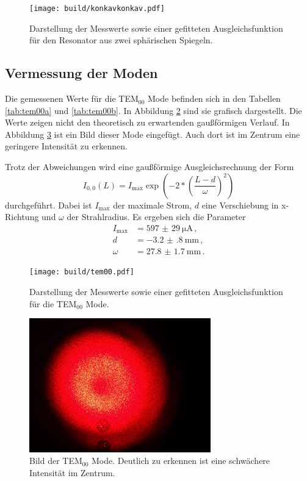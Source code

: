 \begin{figure}
  \centering
  \texttt{[image: build/konkavkonkav.pdf]}
  \caption{Darstellung der Messwerte sowie einer gefitteten Ausgleichsfunktion für den
  Resonator aus zwei sphärischen Spiegeln.}
  \label{fig:konkavkonkav}
\end{figure}

\subsection{Vermessung der Moden}
\label{subsec:moden}

Die gemessenen Werte für die TEM$_{\mathrm{00}}$ Mode befinden sich in den Tabellen \ref{tab:tem00a} und \ref{tab:tem00b}. In Abbildung \ref{fig:tem00} sind sie
grafisch dargestellt. Die Werte zeigen nicht den theoretisch zu erwartenden gaußförmigen
Verlauf. In Abbildung \ref{fig:bild} ist ein Bild dieser Mode eingefügt. Auch dort
ist im Zentrum eine geringere Intensität zu erkennen.

Trotz der Abweichungen wird eine gaußförmige Ausgleichsrechnung der Form
\begin{equation*}
  I_{0,0}(L)=I_{\text{max}} \exp\left(-2*\left(\frac{L-d}{\omega}\right)^2\right)
\end{equation*}
durchgeführt. Dabei ist $I_{\text{max}}$ der maximale Strom, $d$ eine Verschiebung in
x-Richtung und $\omega$ der Strahlradius.  Es ergeben sich die Parameter
\begin{align*}
  I_{\text{max}}&=\SI{597(29)}{\micro\ampere} \,,\\
  d&= \SI{-3.2(8)}{\milli\metre} \,, \\
  \omega&=\SI{27.8(17)}{\milli\metre} \,.
\end{align*}

\begin{figure}
  \centering
  \texttt{[image: build/tem00.pdf]}
  \caption{Darstellung der Messwerte sowie einer gefitteten Ausgleichsfunktion für die TEM$_{\mathrm{00}}$ Mode.}
  \label{fig:tem00}
\end{figure}

\begin{figure}
  \centering
  \includegraphics[width=0.7\textwidth]{data/tem00.png}
  \caption{Bild der TEM$_{\mathrm{00}}$ Mode. Deutlich zu erkennen ist eine schwächere Intensität im Zentrum.}
  \label{fig:bild}
\end{figure}


